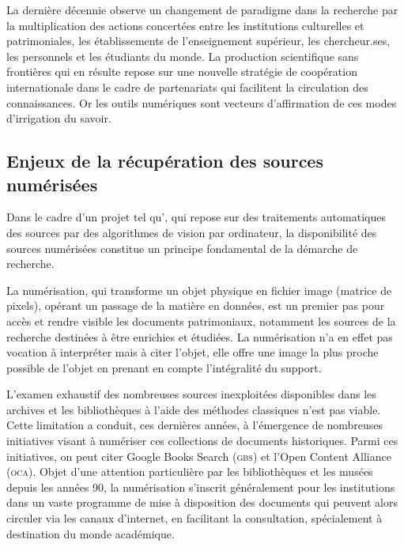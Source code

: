 La dernière décennie observe un changement de paradigme dans la
recherche par la multiplication des actions concertées entre les
institutions culturelles et patrimoniales, les établissements de
l'enseignement supérieur, les chercheur.ses, les personnels et les
étudiants du monde. La production scientifique sans frontières qui en
résulte repose sur une nouvelle stratégie de coopération internationale
dans le cadre de partenariats qui facilitent la circulation des
connaissances. Or les outils numériques sont vecteurs d'affirmation de
ces modes d'irrigation du savoir.

\hypertarget{enjeux-de-la-recuperation-des-sources-numerisees}{%
\subsection{Enjeux de la récupération des sources
numérisées}\label{enjeux-de-la-recuperation-des-sources-numerisees}}

Dans le cadre d'un projet tel qu'\eida, qui repose sur des traitements
automatiques des sources par des algorithmes de vision par ordinateur,
la disponibilité des sources numérisées constitue un principe
fondamental de la démarche de recherche.

La numérisation, qui transforme un objet physique en fichier image
(matrice de pixels), opérant un passage de la matière en données, est un
premier pas pour accès et rendre visible les documents
patrimoniaux, notamment les sources de la recherche destinées à être
enrichies et étudiées. La numérisation n'a en effet pas vocation à
interpréter mais à citer l'objet, elle offre une image la plus proche
possible de l'objet en prenant en compte l'intégralité du support.

L'examen exhaustif des nombreuses sources inexploitées disponibles dans
les archives et les bibliothèques à l'aide des méthodes classiques n'est
pas viable. Cette limitation a conduit, ces dernières années, à
l'émergence de nombreuses initiatives visant à numériser ces collections
de documents historiques. Parmi ces initiatives, on peut citer Google
Books Search (\textsc{gbs}) et l'Open Content Alliance (\textsc{oca}). Objet d'une
attention particulière par les bibliothèques et les musées depuis les
années 90, la numérisation s'inscrit généralement pour les institutions
dans un vaste programme de mise à disposition des documents qui peuvent
alors circuler via les canaux d'internet, en facilitant la consultation,
spécialement à destination du monde académique.

